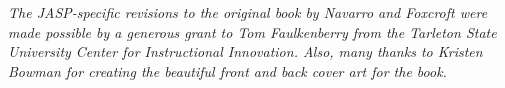 

\newpage

\vspace*{7cm}
\begin{center}
{\it \large
The JASP-specific revisions to the original book by Navarro and Foxcroft were made possible by a generous grant to Tom Faulkenberry from the Tarleton State University Center for Instructional Innovation. Also, many thanks to Kristen Bowman for creating the beautiful front and back cover art for the book.
}
\end{center}

